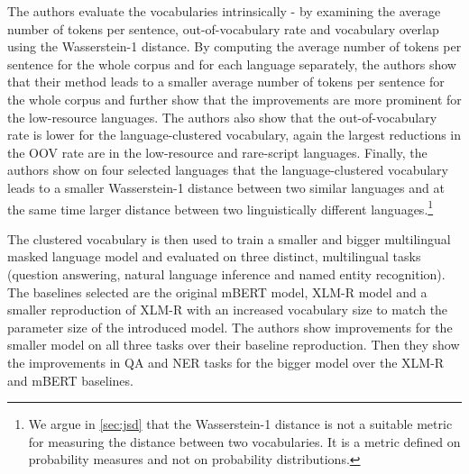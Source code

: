 The authors evaluate the vocabularies intrinsically - by examining the average number of tokens per sentence, out-of-vocabulary rate and vocabulary overlap using the Wasserstein-1 distance.
By computing the average number of tokens per sentence for the whole corpus and for each language separately, the authors show that their method leads to a smaller average number of tokens per sentence for the whole corpus and further show that the improvements are more prominent for the low-resource languages. The authors also show that the out-of-vocabulary rate is lower for the language-clustered vocabulary, again the largest reductions in the OOV rate are in the low-resource and rare-script languages. Finally, the authors show on four selected languages that the language-clustered vocabulary leads to a smaller Wasserstein-1 distance between two similar languages and at the same time larger distance between two linguistically different languages.\footnote{We argue in \autoref{sec:jsd} that the Wasserstein-1 distance is not a suitable metric for measuring the distance between two vocabularies. It is a metric defined on probability measures and not on probability distributions.}

The clustered vocabulary is then used to train a smaller and bigger multilingual masked language model and evaluated on three distinct, multilingual tasks (question answering, natural language inference and named entity recognition). The baselines selected are the original mBERT model, XLM-R model and a smaller reproduction of XLM-R with an increased vocabulary size to match the parameter size of the introduced model. The authors show improvements for the smaller model on all three tasks over their baseline reproduction. Then they show the improvements in QA and NER tasks for the bigger model over the XLM-R and mBERT baselines. 

